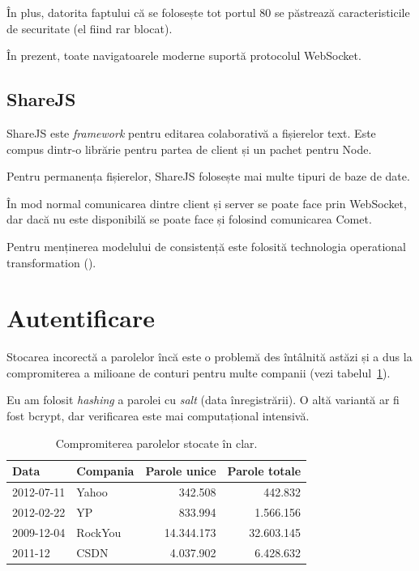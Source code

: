\documentclass[a4wide,12pt]{report}
\newcommand{\eng}[1]{\emph{#1}} %
\newcommand{\acr}[1]{{\textsmaller[1]{\textsc{#1}}}} %
\begin{document}
În plus, datorita faptului că se folosește tot portul 80 se păstrează
caracteristicile de securitate (el fiind rar blocat).

În prezent, toate navigatoarele moderne suportă protocolul WebSocket.

\subsection{ShareJS}
\label{sharejssub}

ShareJS este \eng{framework} pentru editarea colaborativă a fișierelor text.
Este compus dintr-o librărie pentru partea de client și un pachet pentru Node.

Pentru permanența fișierelor, ShareJS folosește mai multe tipuri de baze de
date.

În mod normal comunicarea dintre client și server se poate face prin WebSocket,
dar dacă nu este disponibilă se poate face și folosind comunicarea Comet.

Pentru menținerea modelului de consistență este folosită technologia operational
transformation (\acr{OT}).

\section{Autentificare}

Stocarea incorectă a parolelor încă este o problemă des întâlnită astăzi și a
dus la compromiterea a milioane de conturi pentru multe companii (vezi
tabelul~\ref{paroletab}).

Eu am folosit \eng{hashing} a parolei cu \eng{salt} (data înregistrării). O altă
variantă ar fi fost bcrypt, dar verificarea este mai computațional intensivă.

\begin{table}[hb]
\begin{center}
\begin{tabular}{l l r r}
Data & Compania & Parole unice & Parole totale \\
\hline
2012-07-11 & Yahoo & 342.508 & 442.832 \\
2012-02-22 & YP & 833.994 & 1.566.156 \\
2009-12-04 & RockYou & 14.344.173 & 32.603.145 \\
2011-12 & CSDN & 4.037.902 & 6.428.632 \\
\end{tabular}
\end{center}
\caption{Compromiterea parolelor stocate în clar\cite{passleak}.}
\label{paroletab}
\end{table}
\end{document}
